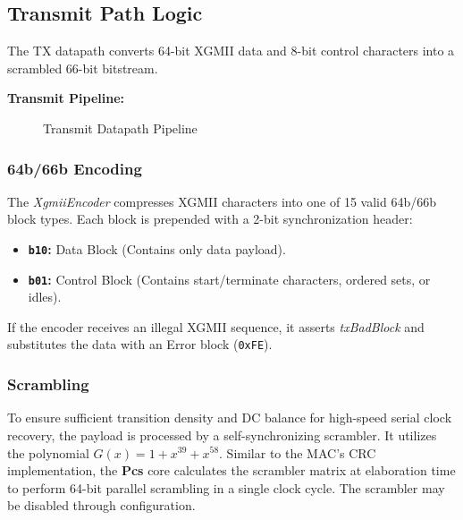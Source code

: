 \subsection{Transmit Path Logic}
The TX datapath converts 64-bit XGMII data and 8-bit control characters into a scrambled 66-bit bitstream.

\textbf{Transmit Pipeline:}
\begin{figure}[H]
\centering
{}
\caption{Transmit Datapath Pipeline}\label{fig:pcs_tx_pipe}
\end{figure}

\subsubsection{64b/66b Encoding}
The \textit{XgmiiEncoder} compresses XGMII characters into one of 15 valid 64b/66b block types. Each block is prepended with a 2-bit synchronization header:
\begin{itemize}
    \item \textbf{\texttt{b10}:} Data Block (Contains only data payload).
    \item \textbf{\texttt{b01}:} Control Block (Contains start/terminate characters, ordered sets, or idles).
\end{itemize}
If the encoder receives an illegal XGMII sequence, it asserts \textit{txBadBlock} and substitutes the data with an Error block (\texttt{0xFE}).

\subsubsection{Scrambling}
To ensure sufficient transition density and DC balance for high-speed serial clock recovery, the payload is processed by a self-synchronizing scrambler. It utilizes the polynomial $G(x) = 1 + x^{39} + x^{58}$. Similar to the MAC's CRC implementation, the \textbf{Pcs} core calculates the scrambler matrix at elaboration time to perform 64-bit parallel scrambling in a single clock cycle.
The scrambler may be disabled through configuration.

